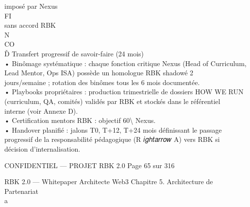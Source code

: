 imposé par Nexus\\
\vspace{0.5em}
\vspace{0.5em}
\vspace{0.5em}
\vspace{0.5em}
FI\\
sans accord RBK\\
\vspace{0.5em}
\vspace{0.5em}
\vspace{0.5em}
N\\
CO\\
Ď Transfert progressif de savoir-faire (24 mois)\\
• Binômage systématique : chaque fonction critique Nexus (Head of Curriculum, Lead Mentor, Ops ISA) possède un homologue RBK shadowé 2\\
jours/semaine ; rotation des binômes tous les 6 mois documentée.\\
• Playbooks propriétaires : production trimestrielle de dossiers HOW WE RUN (curriculum, QA, comités) validés par RBK et stockés dans le référentiel\\
interne (voir Annexe D).\\
• Certification mentors RBK : objectif 60\textbackslash{}%
Nexus.\\
• Handover planifié : jalons T0, T+12, T+24 mois définissant le passage progressif de la responsabilité pédagogique (R 𝑖𝑔ℎ𝑡𝑎𝑟𝑟𝑜𝑤 A) vers RBK si\\
décision d’internalisation.\\
\vspace{0.5em}
\vspace{0.5em}
\vspace{0.5em}
\vspace{0.5em}
\begin{confidential}CONFIDENTIEL — PROJET RBK 2.0                                          Page 65 sur 316\end{confidential}
RBK 2.0 — Whitepaper Architecte Web3                                                                                    Chapitre 5. Architecture de Partenariat\\
\vspace{0.5em}
\vspace{0.5em}
\vspace{0.5em}
a\\
